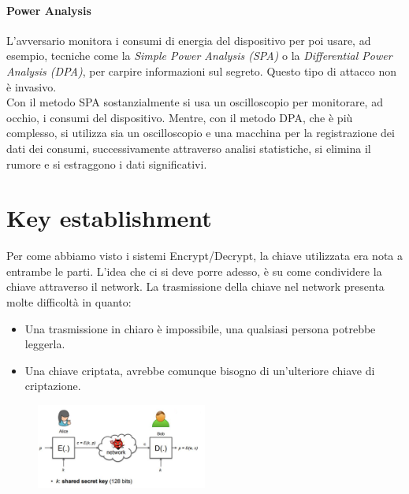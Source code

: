 \documentclass[a4paper,12pt]{article}
\begin{document}
\paragraph{Power Analysis} L'avversario monitora i consumi di energia del dispositivo per poi usare, ad esempio, tecniche come la \textit{Simple Power Analysis (SPA)} o la \textit{Differential Power Analysis (DPA)}, per carpire informazioni sul segreto.
Questo tipo di attacco non è invasivo. \\
Con il metodo SPA sostanzialmente si usa un oscilloscopio per monitorare, ad occhio, i consumi del dispositivo.
Mentre, con il metodo DPA, che è più complesso, si utilizza sia un oscilloscopio e una macchina per la registrazione dei dati dei consumi, successivamente attraverso analisi statistiche, si elimina il rumore e si estraggono i dati significativi.

\newpage

\section{Key establishment}
Per come abbiamo visto i sistemi Encrypt/Decrypt, la chiave utilizzata era nota a entrambe le parti.
L'idea che ci si deve porre adesso, è su come condividere la chiave attraverso il network. La trasmissione della chiave nel network presenta molte difficoltà in quanto:
\begin{itemize}
	\item Una trasmissione in chiaro è impossibile, una qualsiasi persona potrebbe leggerla.
	\item Una chiave criptata, avrebbe comunque bisogno di un'ulteriore chiave di criptazione.
\end{itemize}
\begin{figure}[H]
	\centering
	\includegraphics[width=0.5\textwidth]{img/key-management.png}
\end{figure}
\end{document}
